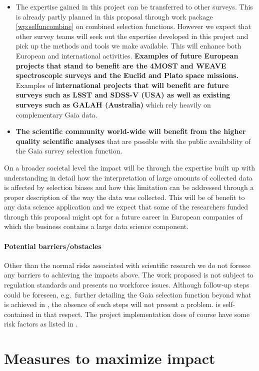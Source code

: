 \begin{itemize}
    \item The expertise gained in this project can be transferred to other surveys. This is already partly planned in this proposal through work package \ref{wp:selfuncombine} on combined selection functions. However we expect that other survey teams will seek out the expertise developed in this project and  pick up the methods and tools we make available. This will enhance both European and international activities. \textbf{Examples of future European projects that stand to benefit are the 4MOST and WEAVE spectroscopic surveys and the Euclid and Plato space missions.} Examples of \textbf{international projects that will benefit are future surveys such as LSST and SDSS-V (USA) as well as existing surveys such as GALAH (Australia)} which rely heavily on complementary Gaia data.
    \item \textbf{The scientific community world-wide will benefit from the higher quality scientific analyses} that are possible with the public availability of the Gaia survey selection function.
\end{itemize}

On a broader societal level the impact will be through the expertise built up with understanding in detail how the interpretation of large amounts of collected data is affected by selection biases and how this limitation can be addressed through a proper description of the way the data was collected. This will be of benefit to any data science application and we expect that some of the researchers funded through this proposal might opt for a future career in European companies of which the business contains a large data science component.

\paragraph{Potential barriers/obstacles} Other than the normal risks associated with scientific research we do not foresee any barriers to achieving the impacts above. The work proposed is not subject to regulation standards and presents no workforce issues. Although follow-up steps could be foreseen, e.g.\ further detailing the Gaia selection function beyond what is achieved in {\acro}, the absence of such steps will not present a problem. {\acro} is self-contained in that respect. The project implementation does of course have some risk factors as listed in .

\section{Measures to maximize impact} 
\label{sec:maximize-impact}

